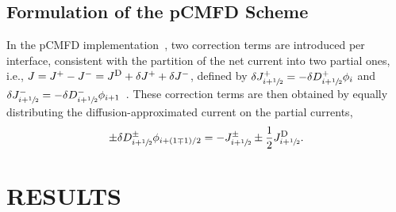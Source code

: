 \documentclass[letterpaper]{mc2021}
\newcommand{\hzi}{\ensuremath{\sfrac{1}{2}}}
\newcommand{\jD}{\ensuremath{J^{\textrm{\scriptsize{D}}}}}
\newcommand{\jp}{\ensuremath{J^+}}
\newcommand{\jm}{\ensuremath{J^-}}
\begin{document}
\vspace{-2.5mm}

\subsection{Formulation of the pCMFD Scheme} 
\label{sec:pcmfd}

In the pCMFD implementation~\cite{Cho-2003}, two correction terms are introduced per interface, consistent with the partition of the net current into two partial ones, i.e., $J = \jp - \jm = \jD + \delta J^+ + \delta J^-$, defined by $\delta \jp _{i+\hzi} = -\delta D^+ _{i+\hzi} \phi_i$ and $\delta \jm _{i+\hzi} = -\delta D^- _{i+\hzi} \phi_{i+1}$~\cite{Jarrett-2016,Zhu-2016}. These correction terms are then obtained by equally distributing the diffusion-approximated current on the partial currents,
\begin{equation}
\label{eq:delta-D-pCMFD}
\pm \delta D^{\pm} _{i+\hzi} \phi_{i+(1\mp 1)/2} = 
- J^\pm_{i+\hzi} \pm \frac{1}{2}\jD_{i+\hzi} .
\end{equation}

\vspace{-6.5mm}
%

\section{RESULTS}
\end{document}
